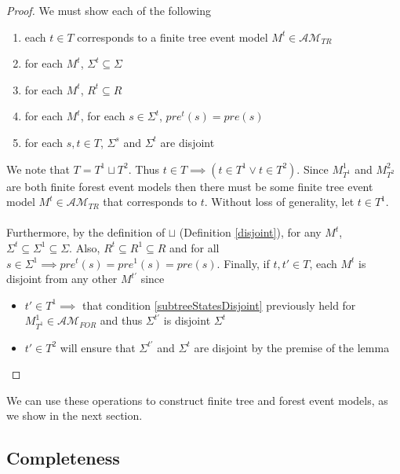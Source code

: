 \documentclass[12pt, a4paper, titlepage]{scrartcl}
\numberwithin{equation}{section}
\newcommand{\eventClass}{\mathcal{AM}}
\newcommand{\treeClass}{\eventClass_{TR}}
\newcommand{\forestClass}{\eventClass_{FOR}}
\begin{document}
\begin{proof}
We must show each of the following
\begin{enumerate}
	\item each $t \in T$ corresponds to a finite tree event model $M^t \in \treeClass$ \label{treeCorrespondence}
	\item for each $M^t$, $\Sigma^t \subseteq \Sigma$ \label{forestStateSubsets}
	\item for each $M^t$, $R^t \subseteq R$ \label{forestEdgeSubsets}
	\item for each $M^t$, for each $s \in \Sigma^t$, $pre^t(s) = pre(s)$ \label{preconMatch}
	\item for each $s, t \in T$, $\Sigma^s$ and $\Sigma^t$ are disjoint \label{subtreeStatesDisjoint}
\end{enumerate}

We note that $T = T^1 \sqcup T^2$.
Thus $t \in T \implies (t \in T^1 \lor t \in T^2)$.
Since $M^1_{T^1}$ and $M^2_{T^2}$ are both finite forest event models then there must be some finite
tree event model $M^t \in \treeClass$ that corresponds to $t$.
Without loss of generality, let $t \in T^1$.\\
\\
Furthermore, by the definition of $\sqcup$ (Definition \ref{disjoint}), for any $M^t$, $\Sigma^t \subseteq \Sigma^1 \subseteq \Sigma$.
Also, $R^t \subseteq R^1 \subseteq R$ and for all $s \in \Sigma^1 \implies pre^t(s) = pre^1(s) =
pre(s)$.
Finally, if $t, t' \in T$, each $M^t$ is disjoint from any other $M^{t'}$ since
\begin{itemize}
	\item $t' \in T^1 \implies$ that condition \ref{subtreeStatesDisjoint} previously held for
	$M^1_{T^1} \in \forestClass$ and thus $\Sigma^{t'}$ is disjoint $\Sigma^t$
	\item $t' \in T^2$ will ensure that $\Sigma^{t'}$ and $\Sigma^t$ are disjoint by the premise of
	the lemma
\end{itemize}
\end{proof}

We can use these operations to construct finite tree and forest event models, as we show
in the next section.

\subsection{Completeness}
\end{document}
